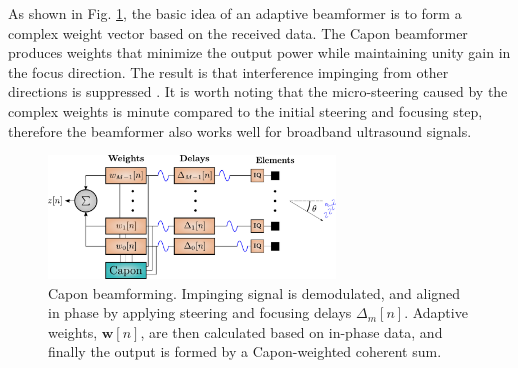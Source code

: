 \documentclass[journal]{IEEEtran}
\newcommand{\mat}[1]{\mathbf{#1}}
\renewcommand{\vec}[1]{\mathbf{#1}}
\begin{document}
As shown in Fig. \ref{fig:mvbf}, the basic idea of an adaptive beamformer is to form a complex weight vector based on the received data.   The Capon beamformer produces weights that minimize the output power while maintaining unity gain in the focus direction. The result is that interference impinging from other directions is suppressed \cite{Synnevag2007}. It is worth noting that the micro-steering caused by the complex weights is minute compared to the initial steering and focusing step, therefore the beamformer also works well for broadband ultrasound signals.


\begin{figure}
\centerline{\includegraphics[width=3in]{gfx/beamforming_mv.pdf}}
\caption{Capon beamforming. Impinging signal is demodulated, and aligned in phase by applying steering and focusing delays $\Delta_m[n]$. Adaptive weights, $\vec{w}[n]$, are then calculated based on in-phase data, and finally the output is formed by a Capon-weighted coherent sum.}
\label{fig:mvbf}
\end{figure}
\end{document}

